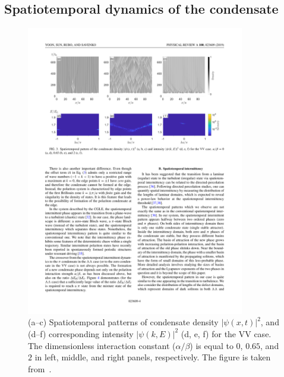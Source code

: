 %
%
\subsection{Spatiotemporal dynamics of the condensate}

\begin{figure}[ht]
\centering
\includegraphics[width=0.85\textwidth]{Fig/Ch4/fig3.pdf}
\caption[Spatiotemporal patterns of the condensate density for the VV case]{(a--c) Spatiotemporal patterns of condensate density $|\psi(x,t)|^2$, and (d--f) corresponding intensity $|\psi(k,E)|^2$ (d, e, f) for the VV case. The dimensionless interaction constant ($\alpha/\beta$) is equal to $0$, $0.65$, and $2$ in left, middle, and right panels, respectively. The figure is taken from~\cite{Yoon:2019aa}.
}
\label{CH4_fig:2-2}
\end{figure}

